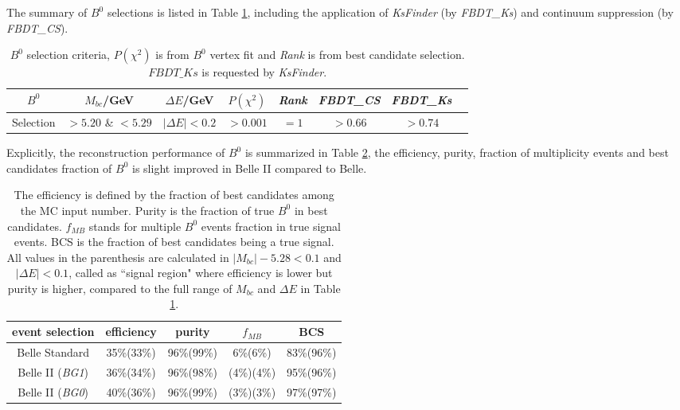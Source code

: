 The summary of $B^0$ selections is listed in Table \ref{tab:b0select}, including the application of \textit{KsFinder} (by \textit{FBDT\_Ks}) and continuum suppression (by \textit{FBDT\_CS}).
\begin{table}[H]
	\centering 
	\begin{tabular}{|c|c|c|c|c|c|c|c|} 
		\hline
		$B^0$  & $M_{bc}$/GeV& $\Delta E$/GeV & $P(\chi^2)$ & \textit{Rank} & \textit{FBDT\_CS} & \textit{FBDT\_Ks}\\
		\hline
		Selection & $> 5.20$ \& $< 5.29$  &  $ |\Delta E|< 0.2$ & $> 0.001$  & $=1$ & $>0.66$ & $>0.74$\\
		\hline
	\end{tabular}
	\caption{$B^0$ selection criteria, $P(\chi^2)$ is from $B^0$ vertex fit and \textit{Rank} is from best candidate selection. $FBDT\_Ks$ is requested by \textit{KsFinder}.}
	\label{tab:b0select}
\end{table}

Explicitly, the reconstruction performance of $B^0$ is summarized in Table \ref{tab:b0stats}, the efficiency, purity, fraction of multiplicity events and best candidates fraction of $B^0$ is slight improved in Belle II compared to Belle.
\begin{table}[H]
	\centering
	\begin{tabular}{c|c|c|c|c}
		\hline
		event selection & efficiency & purity  & $f_{MB}$  & BCS \\
		\hline
		\hline
		Belle Standard & 35\%(33\%) & 96\%(99\%) & 6\%(6\%) & 83\%(96\%)\\
		\hline 
		Belle II (\textit{BG1}) & 36\%(34\%) & 96\%(98\%) & (4\%)(4\%) & 95\%(96\%)\\
		\hline
		Belle II (\textit{BG0}) & 40\%(36\%) & 96\%(99\%) & (3\%)(3\%) & 97\%(97\%)\\
		\hline
	\end{tabular}
	\caption{The efficiency is defined by the fraction of best candidates among the MC input number. Purity is the fraction of true $B^0$ in best candidates. $f_{MB}$ stands for multiple $B^0$ events fraction in true signal events. BCS is the fraction of best candidates being a true signal. All values in the parenthesis are calculated in $| M_{bc} |- 5.28 < 0.1$ and $|\Delta E| < 0.1$, called as ``signal region" where efficiency is lower but purity is higher, compared to the full range of $M_{bc}$ and $\Delta E$ in Table \ref{tab:b0select}. }
	\label{tab:b0stats}
\end{table}


